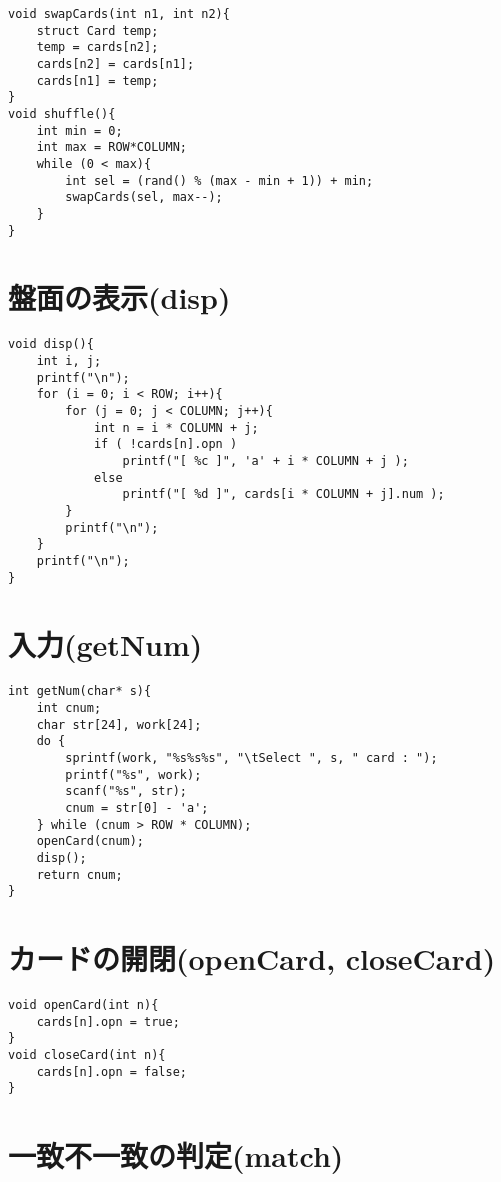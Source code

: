 \documentclass[uplatex,a4paper,11pt,oneside,openany]{jsbook}
\begin{document}
\begin{lstlisting}
void swapCards(int n1, int n2){
    struct Card temp;
    temp = cards[n2];
    cards[n2] = cards[n1];
    cards[n1] = temp;
}
void shuffle(){
    int min = 0;
    int max = ROW*COLUMN;
    while (0 < max){
        int sel = (rand() % (max - min + 1)) + min;
        swapCards(sel, max--);
    }
}
\end{lstlisting}

\section{盤面の表示(disp)}

\begin{lstlisting}
void disp(){
    int i, j;
    printf("\n");
    for (i = 0; i < ROW; i++){
        for (j = 0; j < COLUMN; j++){
            int n = i * COLUMN + j;
            if ( !cards[n].opn )
                printf("[ %c ]", 'a' + i * COLUMN + j );
            else
                printf("[ %d ]", cards[i * COLUMN + j].num );
        }
        printf("\n");
    }
    printf("\n");
}
\end{lstlisting}

\section{入力(getNum)}

\begin{lstlisting}
int getNum(char* s){
    int cnum;
    char str[24], work[24];
    do {
        sprintf(work, "%s%s%s", "\tSelect ", s, " card : ");
        printf("%s", work);
        scanf("%s", str);
        cnum = str[0] - 'a';
    } while (cnum > ROW * COLUMN);
    openCard(cnum);
    disp();
    return cnum;
}
\end{lstlisting}

\section{カードの開閉(openCard, closeCard)}

\begin{lstlisting}
void openCard(int n){
    cards[n].opn = true;
}
void closeCard(int n){
    cards[n].opn = false;
}
\end{lstlisting}

\section{一致不一致の判定(match)}
\end{document}
